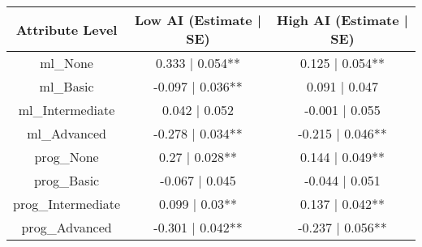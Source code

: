 \begin{table}[t]
\fontsize{12.0pt}{14.4pt}\selectfont
\begin{tabular*}{\linewidth}{@{\extracolsep{\fill}}ccc}
\toprule
Attribute Level & Low AI (Estimate | SE) & High AI (Estimate | SE) \\ 
\midrule\addlinespace[2.5pt]
ml\_None & 0.333 | 0.054** & 0.125 | 0.054** \\ 
ml\_Basic & -0.097 | 0.036** & 0.091 | 0.047 \\ 
ml\_Intermediate & 0.042 | 0.052 & -0.001 | 0.055 \\ 
ml\_Advanced & -0.278 | 0.034** & -0.215 | 0.046** \\ 
prog\_None & 0.27 | 0.028** & 0.144 | 0.049** \\ 
prog\_Basic & -0.067 | 0.045 & -0.044 | 0.051 \\ 
prog\_Intermediate & 0.099 | 0.03** & 0.137 | 0.042** \\ 
prog\_Advanced & -0.301 | 0.042** & -0.237 | 0.056** \\ 
\bottomrule
\end{tabular*}
\end{table}

